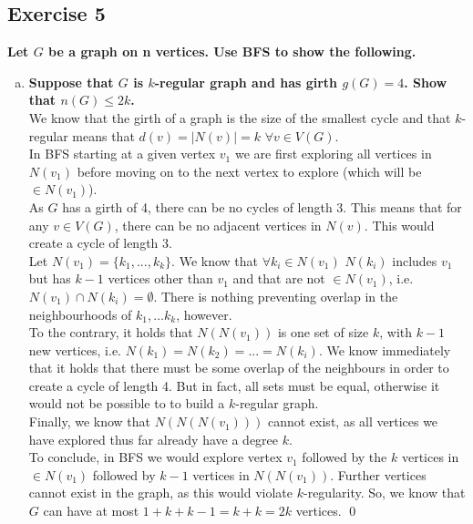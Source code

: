 \subsection*{Exercise 5}
\boldmath
\textbf{Let $G$ be a graph on n vertices. Use BFS to show the following.}
\begin{enumerate}[a)]
    \item \textbf{Suppose that $G$ is $k$-regular graph and has girth $g(G) = 4$. Show that $n(G) \leq 2k$.} \\
    \linebreak 
    \unboldmath
    We know that the girth of a graph is the size of the smallest cycle and that $k$-regular means that $d(v) = |N(v)| = k$ $\forall v \in V(G)$. \\
    \linebreak 
    In BFS starting at a given vertex $v_1$ we are first exploring all vertices in $N(v_1)$ before moving on to the next vertex to explore (which will be $\in N(v_1)$). \\
    \linebreak 
    As $G$ has a girth of 4, there can be no cycles of length 3. This means that for any $v \in V(G)$, there can be no adjacent vertices in $N(v)$. This would create a cycle of length 3. \\
    \linebreak 
    Let $N(v_1) = \{k_1, ..., k_k\}$. We know that $\forall k_i \in N(v_1)$ $ N(k_i)$ includes $v_1$ but has $k-1$ vertices other than $v_1$ and that are not $\in N(v_1)$, i.e. $N(v_1) \cap N(k_i) = \emptyset$. There is nothing preventing overlap in the neighbourhoods of $k_1, ... k_k$, however. \\
    \linebreak 
    To the contrary, it holds that $N(N(v_1))$ is one set of size $k$, with $k-1$ new vertices, i.e. $N(k_1) = N(k_2) = ... = N(k_i)$. We know immediately that it holds that there must be some overlap of the neighbours in order to create a cycle of length 4. But in fact, all sets must be equal, otherwise it would not be possible to to build a $k$-regular graph. \\
    \linebreak 
    Finally, we know that $N(N(N(v_1)))$ cannot exist, as all vertices we have explored thus far already have a degree $k$. \\
    \linebreak 
    To conclude, in BFS we would explore vertex $v_1$ followed by the $k$ vertices in $\in N(v_1)$ followed by $k-1$ vertices in $N(N(v_1))$. Further vertices cannot exist in the graph, as this would violate $k$-regularity. So, we know that $G$ can have at most $1 + k + k-1 = k + k = 2k$ vertices. \qed

\end{enumerate}
